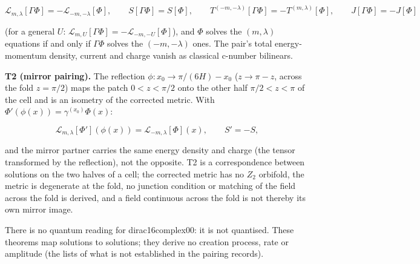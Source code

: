 \documentclass[11pt]{article}
\begin{document}
\[
\mathcal{L}_{m,\lambda}[\Gamma\Phi] = -\mathcal{L}_{-m,-\lambda}[\Phi], \qquad S[\Gamma\Phi] = S[\Phi], \qquad T^{(-m,-\lambda)}[\Gamma\Phi] = -T^{(m,\lambda)}[\Phi], \qquad J[\Gamma\Phi] = -J[\Phi]
\]

(for a general $U$: $\mathcal{L}_{m,U}[\Gamma\Phi] = -\mathcal{L}_{-m,-U}[\Phi]$), and $\Phi$ solves the $(m, \lambda)$ equations if and only if $\Gamma\Phi$ solves the $(-m, -\lambda)$ ones. The pair's total energy-momentum density, current and charge vanish as classical c-number bilinears.

\textbf{T2 (mirror pairing).} The reflection $\phi: x_0 \to \pi/(6H) - x_0$ ($z \to \pi - z$, across the fold $z = \pi/2$) maps the patch $0 < z < \pi/2$ onto the other half $\pi/2 < z < \pi$ of the cell and is an isometry of the corrected metric. With $\Phi'(\phi(x)) = \gamma^{(x_0)}\Phi(x)$:

\[
\mathcal{L}_{m,\lambda}[\Phi'](\phi(x)) = \mathcal{L}_{-m,\lambda}[\Phi](x), \qquad S' = -S ,
\]

and the mirror partner carries the same energy density and charge (the tensor transformed by the reflection), not the opposite. T2 is a correspondence between solutions on the two halves of a cell; the corrected metric has no $Z_2$ orbifold, the metric is degenerate at the fold, no junction condition or matching of the field across the fold is derived, and a field continuous across the fold is not thereby its own mirror image.

There is no quantum reading for dirac16complex00: it is not quantised. These theorems map solutions to solutions; they derive no creation process, rate or amplitude (the lists of what is not established in the pairing records).
\end{document}
